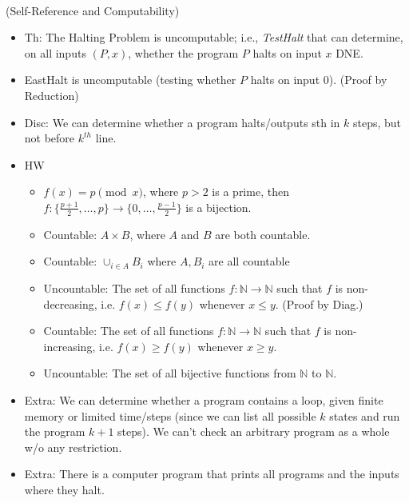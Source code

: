\documentclass{article}
\begin{document}
 \\
(Self-Reference and Computability)
\begin{itemize}
	\item Th: The Halting Problem is uncomputable; i.e., \textit{TestHalt} that can determine, on all inputs $(P, x)$, whether the program $P$ halts on input $x$ DNE.
	\item EastHalt is uncomputable (testing whether $P$ halts on input 0). (Proof by Reduction)
	\item Disc: We can determine whether a program halts/outputs sth in $k$ steps, but not before $k^{th}$ line.
	\item HW
	\begin{itemize}
		\item $f(x)=p\pmod{x}$, where $p>2$ is a prime, then $f:\{\frac{p+1}{2},\dots,p\} \rightarrow \{0,\dots,\frac{p-1}{2}\}$ is a bijection.
		\item Countable: $A\times B$, where $A$ and $B$ are both countable.
		\item Countable: $\cup_{i\in A} B_i$ where $A, B_i$ are all countable
		\item Uncountable: The set of all functions $f:\mathbb{N}\rightarrow\mathbb{N}$ such that $f$ is non-decreasing, i.e. $f(x)\leq f(y)$ whenever $x\leq y$. (Proof by Diag.)
		\item Countable: The set of all functions $f:\mathbb{N}\rightarrow\mathbb{N}$ such that $f$ is non-increasing, i.e. $f(x)\geq f(y)$ whenever $x\geq y$.
		\item Uncountable: The set of all bijective functions from $\mathbb{N}$ to $\mathbb{N}$.
	\end{itemize}
	\item Extra: We can determine whether a program contains a loop, given {\color{red} finite memory or limited time/steps} (since we can list all possible $k$ states and run the program $k+1$ steps). We can't check an arbitrary program as a whole w/o any restriction.
	\item Extra: There is a computer program that prints all programs and the inputs where they halt.
\end{itemize}
\end{document}
